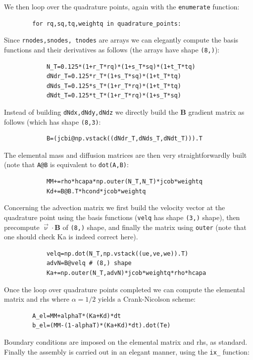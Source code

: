 We then loop over the quadrature points, again with the \lstinline{enumerate}
function:
\begin{lstlisting}
        for rq,sq,tq,weightq in quadrature_points:
\end{lstlisting}
Since \lstinline{rnodes,snodes, tnodes} are arrays we can 
elegantly compute the basis functions and their derivatives as follows
(the arrays have shape \lstinline{(8,)}):
\begin{lstlisting}
            N_T=0.125*(1+r_T*rq)*(1+s_T*sq)*(1+t_T*tq)
            dNdr_T=0.125*r_T*(1+s_T*sq)*(1+t_T*tq)
            dNds_T=0.125*s_T*(1+r_T*rq)*(1+t_T*tq)
            dNdt_T=0.125*t_T*(1+r_T*rq)*(1+s_T*sq)
\end{lstlisting}

Instead of building \lstinline{dNdx,dNdy,dNdz} we directly build the 
${\bm B}$ gradient matrix as follows (which has shape \lstinline{(8,3)}:
\begin{lstlisting}
            B=(jcbi@np.vstack((dNdr_T,dNds_T,dNdt_T))).T
\end{lstlisting}
The elemental mass and diffusion matrices are then very straightforwardly built
(note that \lstinline{A@B} is equivalent to \lstinline{dot(A,B)}:
\begin{lstlisting}
            MM+=rho*hcapa*np.outer(N_T,N_T)*jcob*weightq
            Kd+=B@B.T*hcond*jcob*weightq
\end{lstlisting}
Concerning the advection matrix we first build the 
velocity vector at the quadrature point using the 
basis functions (\lstinline{velq} has shape \lstinline{(3,)} shape),
then precompute $\vec\upnu \cdot {\bm B}$ of \lstinline{(8,)} shape,
and finally the matrix using \lstinline{outer} (note that 
one should check Ka is indeed correct here).

\begin{lstlisting}
            velq=np.dot(N_T,np.vstack((ue,ve,we)).T)
            advN=B@velq # (8,) shape
            Ka+=np.outer(N_T,advN)*jcob*weightq*rho*hcapa
\end{lstlisting}

Once the loop over quadrature points completed
we can compute the elemental matrix and rhs where
$\alpha=1/2$ yields a Crank-Nicolson scheme: 
\begin{lstlisting}
        A_el=MM+alphaT*(Ka+Kd)*dt
        b_el=(MM-(1-alphaT)*(Ka+Kd)*dt).dot(Te)
\end{lstlisting}

Boundary conditions are imposed on the elemental matrix and rhs, as standard.
Finally the assembly is carried out in an elegant manner, using the \lstinline{ix_}
function:

